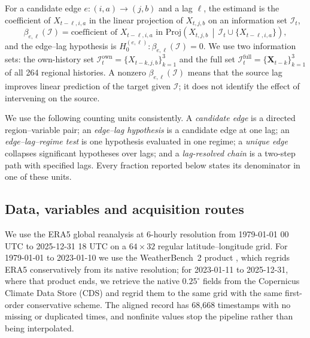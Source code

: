 \documentclass[preprint,12pt]{elsarticle}
\begin{document}
For a candidate edge $e:(i,a)\rightarrow(j,b)$ and a lag $\ell$, the estimand is the coefficient of $X_{t-\ell,i,a}$ in the linear projection of $X_{t,j,b}$ on an information set $\mathcal{I}_t$,
\begin{equation}
\beta_{e,\ell}(\mathcal{I})=\text{coefficient of }X_{t-\ell,i,a}\text{ in }\mathrm{Proj}\left(X_{t,j,b}\,\middle|\,\mathcal{I}_t\cup\{X_{t-\ell,i,a}\}\right),
\label{eq:estimand}
\end{equation}
and the edge--lag hypothesis is $H_0^{(e,\ell)}:\beta_{e,\ell}(\mathcal{I})=0$. We use two information sets: the own-history set $\mathcal{I}^{\mathrm{own}}_t=\{X_{t-k,j,b}\}_{k=1}^{3}$ and the full set $\mathcal{I}^{\mathrm{full}}_t=\{\mathbf{X}_{t-k}\}_{k=1}^{3}$ of all 264 regional histories. A nonzero $\beta_{e,\ell}(\mathcal{I})$ means that the source lag improves linear prediction of the target given $\mathcal{I}$; it does not identify the effect of intervening on the source.

We use the following counting units consistently. A \emph{candidate edge} is a directed region--variable pair; an \emph{edge--lag hypothesis} is a candidate edge at one lag; an \emph{edge--lag--regime test} is one hypothesis evaluated in one regime; a \emph{unique edge} collapses significant hypotheses over lags; and a \emph{lag-resolved chain} is a two-step path with specified lags. Every fraction reported below states its denominator in one of these units.

\subsection{Data, variables and acquisition routes}
\label{subsec:data}

We use the ERA5 global reanalysis \citep{Soci2024ERA5} at 6-hourly resolution from 1979-01-01 00 UTC to 2025-12-31 18 UTC on a $64\times32$ regular latitude--longitude grid. For 1979-01-01 to 2023-01-10 we use the WeatherBench~2 product \citep{Rasp2024WeatherBench2}, which regrids ERA5 conservatively from its native resolution; for 2023-01-11 to 2025-12-31, where that product ends, we retrieve the native $0.25^\circ$ fields from the Copernicus Climate Data Store (CDS) and regrid them to the same grid with the same first-order conservative scheme. The aligned record has 68,668 timestamps with no missing or duplicated times, and nonfinite values stop the pipeline rather than being interpolated.
\end{document}
